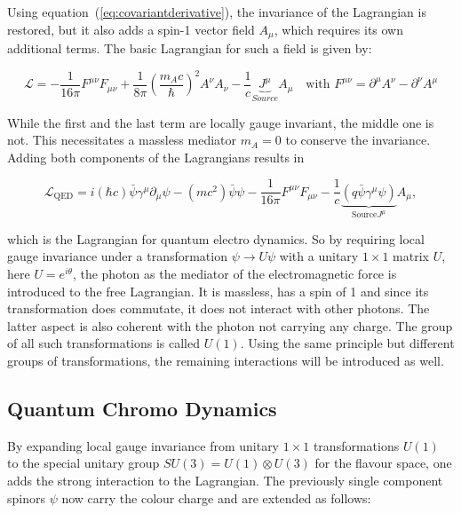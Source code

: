 \noindent Using equation~(\ref{eq:covariantderivative}), the invariance of the Lagrangian is restored, but it also adds a spin-1 vector field $A_\mu$, which requires its own additional terms. The basic Lagrangian for such a field is given by:

\begin{equation}
  \label{eq:procalagrangian}
  \mathcal{L} = - \frac{1}{16 \pi} F^{\mu \nu} F_{\mu \nu} + \frac{1}{8 \pi} \left( \frac{m_A c}{\hbar} \right)^2 A^\nu A_\nu - \frac{1}{c} \underbrace{J^\mu}_{Source} A_\mu \quad \text{with } F^{\mu \nu} = \partial^\mu A^\nu - \partial^\nu A^\mu
\end{equation}

\noindent While the first and the last term are locally gauge invariant, the middle one is not. This necessitates a massless mediator $m_A = 0$ to conserve the invariance. Adding both components of the Lagrangians results in

\begin{equation}
  \label{eq:qedlagrangian}
  \mathcal{L}_{\text{QED}} = i (\hbar c) \bar{\psi} \gamma^\mu \partial_\mu \psi - (m c^2) \bar{\psi} \psi - \frac{1}{16 \pi} F^{\mu \nu} F_{\mu \nu} - \frac{1}{c} \underbrace{(q \bar{\psi} \gamma^\mu  \psi)}_{\text{Source} J^\mu} A_\mu,
\end{equation}

\noindent which is the Lagrangian for quantum electro dynamics. So by requiring local gauge invariance under a transformation $\psi \rightarrow U \psi$ with a unitary $1 \times 1$ matrix $U$, here $U = e^{i \theta}$, the photon as the mediator of the electromagnetic force is introduced to the free Lagrangian. It is massless, has a spin of 1 and since its transformation does commutate, it does not interact with other photons. The latter aspect is also coherent with the photon not carrying any charge. The group of all such transformations is called $U(1)$. Using the same principle but different groups of transformations, the remaining interactions will be introduced as well.

\subsection{Quantum Chromo Dynamics}
\label{sec:qcd}

By expanding local gauge invariance from unitary $1 \times 1$ transformations $U(1)$ to the special unitary group $SU(3) = U(1) \otimes U(3)$ for the flavour space, one adds the strong interaction to the Lagrangian. The previously single component spinors $\psi$ now carry the colour charge and are extended as follows:

